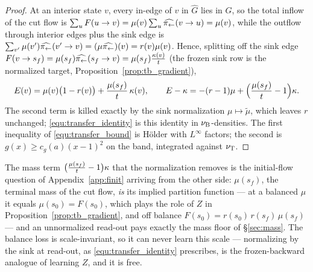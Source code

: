 \begin{proof}
At an interior state $v$, every in-edge of $v$ in $\widehat G$ lies in $G$, so the total
inflow of the cut flow is $\sum_uF(u\rightarrow v)=\mu(v)\sum_u\widehat{\pi_{\leftarrow}}(v\rightarrow u)=\mu(v)$,
while the outflow through interior edges plus the sink edge is
$\sum_{v'}\mu(v')\widehat{\pi_{\leftarrow}}(v'\rightarrow v)=(\mu\widehat{\pi_{\leftarrow}})(v)=r(v)\mu(v)$.
Hence, splitting off the sink edge $F(v\rightarrow s_f)=\mu(s_f)\widehat{\pi_{\leftarrow}}(s_f\rightarrow v)
=\mu(s_f)\frac{\kappa(v)}{t}$ (the frozen sink row is the normalized target,
Proposition~\ref{prop:tb_gradient}),
\begin{equation*}
    E(v)=\mu(v)\bigl(1-r(v)\bigr)+\frac{\mu(s_f)}{t}\,\kappa(v),
    \qquad
    E-\kappa=-(r-1)\mu+\Bigl(\frac{\mu(s_f)}{t}-1\Bigr)\kappa .
\end{equation*}
The second term is killed exactly by the sink normalization $\mu\mapsto\widetilde\mu$,
which leaves $r$ unchanged; \eqref{equ:transfer_identity} is this identity in
$\nu_{\mathrm{B}}$-densities. The first inequality of \eqref{equ:transfer_bound} is H\"older with
$L^\infty$ factors; the second is $g(x)\geq c_g(a)(x-1)^2$ on the band, integrated
against $\nu_{\mathrm{T}}$.
\end{proof}

The mass term $\bigl(\frac{\mu(s_f)}{t}-1\bigr)\kappa$ that the normalization removes is
the initial-flow question of Appendix~\ref{app:finit} arriving from the other side:
$\mu(s_f)$, the terminal mass of the cut flow, \emph{is} its implied partition function
--- at a balanced $\mu$ it equals $\mu(s_0)=F(s_0)$, which plays the role of $Z$ in
Proposition~\ref{prop:tb_gradient}, and off balance $F(s_0)=r(s_0)\,r(s_f)\,\mu(s_f)$ ---
and an unnormalized read-out pays exactly the mass floor of \S\ref{sec:mass}. The balance loss
is scale-invariant, so it can never learn this scale --- normalizing by the sink at
read-out, as \eqref{equ:transfer_identity} prescribes, is the frozen-backward analogue of
learning $Z$, and it is free.

